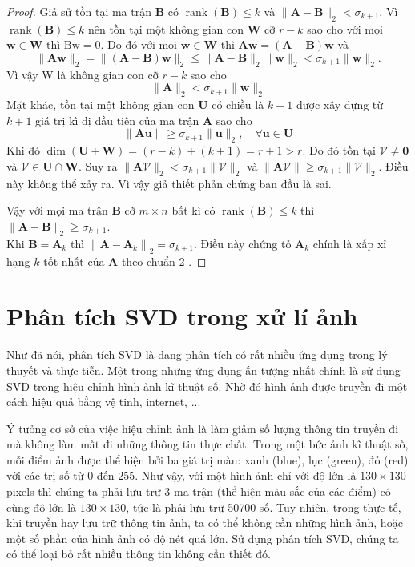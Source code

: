 \documentclass[12pt,a4paper,oneside]{report}
\numberwithin{equation}{section}
\begin{document}
\begin{proof}
Giả sử tồn tại ma trận $\mathbf{B}$ có $\operatorname{rank}(\mathbf{B}) \leqslant k$ và $\|\mathbf{A}-\mathbf{B}\|_{2}<\sigma_{k+1}$. Vì $\operatorname{rank}(\mathbf{B}) \leqslant k$ nên tồn tại một không gian con $\mathbf{W}$ cỡ $r-k$ sao cho với mọi $\mathbf{w} \in \mathbf{W}$ thì $\mathrm{Bw}=0$.
Do đó với mọi $\mathbf{w} \in \mathbf{W}$ thì $\mathbf{A} \mathbf{w}=(\mathbf{A}-\mathbf{B}) \mathbf{w}$ và
$$
\|\mathbf{A} \mathbf{w}\|_{2}=\|(\mathbf{A}-\mathbf{B}) \mathbf{w}\|_{2} \leqslant\|\mathbf{A}-\mathbf{B}\|_{2}\|\mathbf{w}\|_{2}<\sigma_{k+1}\|\mathbf{w}\|_{2} .
$$
Vì vậy W là không gian con cỡ $r-k$ sao cho
$$
\|\mathbf{A}\|_{2}<\sigma_{k+1}\|\mathbf{w}\|_{2}
$$
Mặt khác, tồn tại một không gian con $\mathbf{U}$ có chiều là $k+1$ được xây dựng từ $k+1$ giá trị kì dị đầu tiên của ma trận $\mathbf{A}$ sao cho
$$
\|\mathbf{A} \mathbf{u}\| \geqslant \sigma_{k+1}\|\mathbf{u}\|_{2}, \quad \forall \mathbf{u} \in \mathbf{U}
$$
Khi đó $\operatorname{dim}(\mathbf{U}+\mathbf{W})=(r-k)+(k+1)=r+1>r$. Do đó tồn tại $\mathcal{V} \neq \mathbf{0}$ và $\mathcal{V} \in \mathbf{U} \cap \mathbf{W}$. Suy ra $\|\mathbf{A} \mathcal{V}\|_{2}<\sigma_{k+1}\|\mathcal{V}\|_{2}$ và $\|\mathbf{A} \mathcal{V}\| \geqslant \sigma_{k+1}\|\mathcal{V}\|_{2}$. Điều này không thể xảy ra. Vì vậy giả thiết phản chứng ban đầu là sai.

Vậy với mọi ma trận $\mathbf{B}$ cỡ $m \times n$ bất kì có $\operatorname{rank}(\mathbf{B}) \leqslant k$ thì $\|\mathbf{A}-\mathbf{B}\|_{2} \geqslant \sigma_{k+1}$.\\
Khi $\mathbf{B}=\mathbf{A}_{k}$ thì $\left\|\mathbf{A}-\mathbf{A}_{k}\right\|_{2}=\sigma_{k+1}$. Điều này chứng tỏ $\mathbf{A}_{k}$ chính là xấp xỉ hạng $k$ tốt nhất của $\mathbf{A}$ theo chuẩn 2 . 
\end{proof}

\section{Phân tích SVD trong xử lí ảnh}

Như đã nói, phân tích SVD là dạng phân tích có rất nhiều ứng dụng trong lý thuyết và thực tiễn. Một trong những ứng dụng ấn tượng nhất chính là sử dụng SVD trong hiệu chỉnh hình ảnh kĩ thuật số. Nhờ đó hình ảnh được truyền đi một cách hiệu quả bằng vệ tinh, internet, ...

Ý tưởng cơ sở của việc hiệu chỉnh ảnh là làm giảm số lượng thông tin truyền đi mà không làm mất đi những thông tin thực chất. Trong một bức ảnh kĩ thuật số, mỗi điểm ảnh được thể hiện bởi ba giá trị màu: xanh (blue), lục (green), đỏ (red) với các trị số từ 0 đến 255. Như vậy, với một hình ảnh chỉ với độ lớn là $130 \times 130$ pixels thì chúng ta phải lưu trữ 3 ma trận (thể hiện màu sắc của các điểm) có cùng độ lớn là $130 \times 130$, tức là phải lưu trữ 50700 số. Tuy nhiên, trong thực tế, khi truyền hay lưu trữ thông tin ảnh, ta có thể không cần những hình ảnh, hoặc một số phần của hình ảnh có độ nét quá lớn. Sử dụng phân tích SVD, chúng ta có thể loại bỏ rất nhiều thông tin không cần thiết đó.
\end{document}
